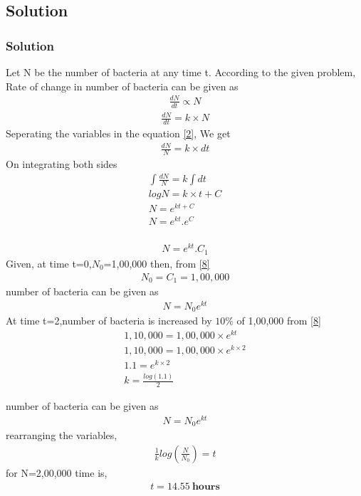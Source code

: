 \documentclass{beamer}
\providecommand{\brak}[1]{\ensuremath{\left(#1\right)}}
\theoremstyle{remark}
\numberwithin{equation}{section}
\begin{document}
\subsection{Solution}
\begin{frame}
\frametitle{Solution}
Let N be the number of bacteria at any time t. According to the given problem, Rate of change in number of bacteria can be given as 
\begin{align}
\frac{dN}{dt} \propto N \label{1}
\end{align}
\begin{align}
\frac{dN}{dt} = k \times N \label{2}
\end{align}
Seperating the variables in the equation \eqref{2}, We get 
\begin{align}
\frac{dN}{N}=k \times dt \label{3}
\end{align}
On integrating both sides
\begin{align}
\int \frac{dN}{N}=k\int dt  \label{4} \\
log N = k \times t+C \label{5} \\
N=e^{kt+C} \label{6} \\
N=e^{kt} . e^{C} \label{7} \\
\end{align}
\end{frame}
\begin{frame}
\begin{align}
    N=e^{kt} . C_1 \label{8}
\end{align}
Given, at time t=0,$N_0$=1,00,000 then, from \eqref{8}
\begin{align}
N_0=C_1=1,00,000 \label{9}
\end{align}
number of bacteria can be given as 
\begin{align}
N = N_0 e^{kt} \label{10}
\end{align}
At time t=2,number of bacteria is increased by $10\%$ of 1,00,000 from \eqref{8} \\
\begin{align}
1,10,000 =1,00,000\times e^{kt} \\
1,10,000 =1,00,000 \times e^{k\times 2} \\
1.1 = e^{k\times 2} \\
k = \frac{log (1.1)}{2}
\end{align}
\end{frame}
\begin{frame}
number of bacteria can be given as 
\begin{align}
N = N_0e^{kt} \label{10}
\end{align}
rearranging the variables,
\begin{align}
\frac{1}{k}log \brak{\frac{N}{N_0}} = t\label{10}
\end{align}
for N=2,00,000 time is,
\begin{align}
    t = 14.55 \ \textbf{hours}
\end{align}
\end{frame}
\end{document}
